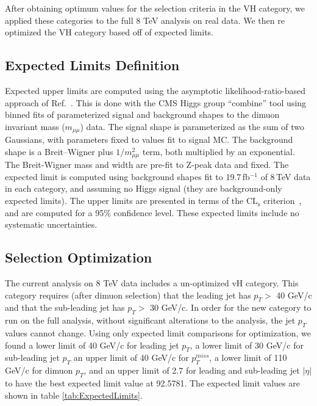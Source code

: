 \documentclass[12pt]{article}
\begin{document}
After obtaining optimum values for the selection criteria in the VH category, we applied these categories to the full 8 TeV analysis on real data. 
We then re optimized the VH category based off of expected limits. 

\subsection{Expected Limits Definition}

Expected upper limits are computed using the asymptotic likelihood-ratio-based approach of 
Ref.~\cite{stats}.  This is done with the CMS Higgs group ``combine'' tool using binned
fits of parameterized signal and background shapes to the dimuon invariant mass 
($m_{\mu\mu}$) data.  The signal shape is parameterized
as the sum of two Gaussians, with parameters fixed to values fit to signal MC.
The background shape is a Breit--Wigner plus $1/m_{\mu\mu}^2$ term, both multiplied
by an exponential.  The Breit-Wigner mass and width are pre-fit to Z-peak data and fixed.
The expected limit is computed
using background shapes fit to 19.7\,fb$^{-1}$ of 8\,TeV data in each category,
and assuming no Higgs signal (they are background-only expected limits).  The upper
limits are presented in terms of the $\mathrm{CL_s}$ criterion~\cite{cls}, and are computed for 
a 95\% confidence level.  These expected limits include no systematic uncertainties.

\subsection{Selection Optimization}

The current analysis on 8 TeV data includes a un-optimized vH category. This category requires (after dimuon selection) 
that the leading jet has $p_{T} >$ 40 GeV/c and that the sub-leading jet has $p_{T} >$ 30 GeV/c. In order for the new category to run
on the full analysis, without significant alterations to the analysis, the jet $p_{T}$ values cannot change. Using only expected limit comparisons for 
optimization, we found a lower limit of 40 GeV/c for leading jet $p_{T}$, a lower limit of 30 GeV/c for sub-leading jet $p_{T}$ an upper 
limit of 40 GeV/c for $p_{T}^{miss}$, a lower limit of 110 GeV/c for dimuon $p_{T}$, and an upper limit of 2.7 for leading and sub-leading 
jet $|\eta|$ to have the best expected limit value at 92.5781. The expected limit values are shown in table \ref{tab:ExpectedLimits}.
\end{document}
